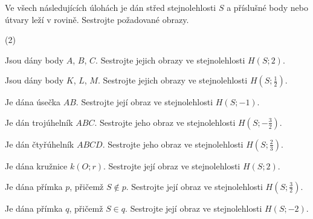 \documentclass[12pt,a4paper]{article}
\begin{document}

\exercisepart


\setcounter{section}{1}

\begin{exercise}

    Ve všech následujících úlohách je dán střed stejnolehlosti $S$ a příslušné body nebo útvary leží v rovině.
    Sestrojte požadované obrazy.

    \begin{tasks}(2)

        \task Jsou dány body $A$, $B$, $C$. Sestrojte jejich obrazy ve stejnolehlosti $H(S;2)$.

        \task Jsou dány body $K$, $L$, $M$. Sestrojte jejich obrazy ve stejnolehlosti $H(S;\tfrac12)$.

        \task Je dána úsečka $AB$. Sestrojte její obraz ve stejnolehlosti $H(S;-1)$.

        \task Je dán trojúhelník $ABC$. Sestrojte jeho obraz ve stejnolehlosti $H(S;-\tfrac32)$.

        \task Je dán čtyřúhelník $ABCD$. Sestrojte jeho obraz ve stejnolehlosti $H(S;\tfrac23)$.

        \task Je dána kružnice $k(O;r)$. Sestrojte její obraz ve stejnolehlosti $H(S;2)$.

        \task Je dána přímka $p$, přičemž $S\notin p$. Sestrojte její obraz ve stejnolehlosti $H(S;\tfrac32)$.

        \task Je dána přímka $q$, přičemž $S\in q$. Sestrojte její obraz ve stejnolehlosti $H(S;-2)$.

    \end{tasks}

\end{exercise}


\end{document}
